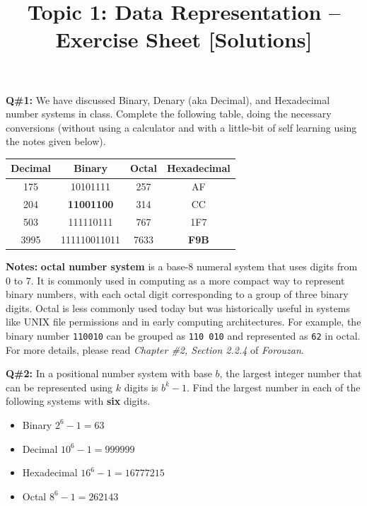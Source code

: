 \documentclass[a4paper,12pt]{article}
\title{Topic 1: Data Representation – Exercise Sheet [Solutions]}
\date{}
\begin{document}
\maketitle

\textbf{Q\#1:} We have discussed Binary, Denary (aka Decimal), and Hexadecimal number systems in class. Complete the following table, doing the necessary conversions (without using a calculator and with a little-bit of self learning using the notes given below).\\[10pt]

\begin{center}
\renewcommand{\arraystretch}{1.5}
\begin{tabular}{|c|c|c|c|}
\hline
\rowcolor{gray!20}
\textbf{Decimal} & \textbf{Binary} & \textbf{Octal} & \textbf{Hexadecimal} \\
\hline
175 & 10101111 & 257 & AF \\
\hline
204 & \textbf{11001100} & 314 & CC \\
\hline
503 & 111110111 & 767 & 1F7 \\
\hline
3995 & 111110011011 & 7633 & \textbf{F9B} \\
\hline
\end{tabular}
\end{center}

\vspace{1em}

\textbf{Notes:} \textbf{octal number system} is a base-8 numeral system that uses digits from 0 to 7. It is commonly used in computing as a more compact way to represent binary numbers, with each octal digit corresponding to a group of three binary digits. Octal is less commonly used today but was historically useful in systems like UNIX file permissions and in early computing architectures. For example, the binary number \texttt{110010} can be grouped as \texttt{110 010} and represented as \texttt{62} in octal. For more details, please read \textit{Chapter \#2, Section 2.2.4} of \textit{Forouzan}.

\vspace{1em}

\textbf{Q\#2:} In a positional number system with base $b$, the largest integer number that can be represented using $k$ digits is $b^k - 1$. Find the largest number in each of the following systems with \textbf{six} digits.

\begin{itemize}
    \item[(a)] Binary \quad $2^6 - 1 = 63$
    \item[(b)] Decimal \quad $10^6 - 1 = 999999$
    \item[(c)] Hexadecimal \quad $16^6 - 1 = 16777215$
    \item[(d)] Octal \quad $8^6 - 1 = 262143$
\end{itemize}
\end{document}
